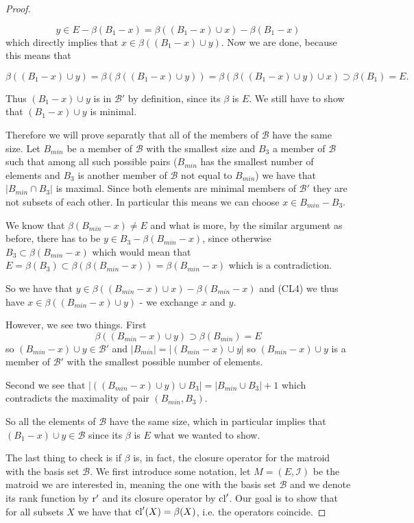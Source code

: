 \begin{proof}
\begin{enumerate}
    $$y \in E - \beta(B_1 - x) = \beta((B_1 -x )\cup x)-\beta(B_1 - x)$$ which directly implies that $x \in \beta((B_1 - x)\cup y)$. Now we are done, because this means that 
    
    $$\beta((B_1-x)\cup y) = \beta(\beta((B_1-x )\cup y)) = \beta(\beta((B_1 - x)\cup y)\cup x) \supset \beta(B_1) = E.$$
    
    
    Thus $(B_1 - x) \cup y$ is in $\mathcal{B}'$ by definition, since its $\beta$ is $E$. We still have to show that $(B_1 - x)\cup y$ is minimal.
    
    Therefore we will prove separatly that all of the members of $\mathcal{B}$ have the same size. Let $B_{min}$ be a member of $\mathcal{B}$ with the smallest size and $B_3$ a member of $\mathcal{B}$ such that among all such possible pairs ($B_{min}$ has the smallest number of elements and $B_3$ is another member of $\mathcal{B}$ not equal to $B_{min}$) we have that $|B_{min} \cap B_3|$ is maximal. Since both elements are minimal members of $\mathcal{B}'$ they are not subsets of each other. In particular this means we can choose $x \in B_{min} - B_3$. 
    
    We know that $\beta(B_{min}-x) \neq E$ and what is more, by the similar argument as before, there has to be $y \in B_3 - \beta(B_{min} - x)$, since otherwise $B_3 \subset \beta(B_{min} - x)$ which would mean that $E = \beta(B_3)\subset \beta(\beta(B_{min}-x)) = \beta(B_{min} - x)$ which is a contradiction. 
    
    So we have that $y \in \beta((B_{min}-x)\cup x) - \beta(B_{min} -x)$ and (CL4) we thus have $x \in \beta((B_{min}-x)\cup y)$ - we exchange $x$ and $y$. 
    
    However, we see two things. First
    $$\beta((B_{min} - x) \cup y) \supset \beta(B_{min}) = E$$ so $(B_{min} - x) \cup y \in \mathcal{B}'$ and $|B_{min}|  = |(B_{min} - x)\cup y|$ so $(B_{min} - x)\cup y$ is a member of $\mathcal{B}'$ with the smallest possible number of elements. 
    
    Second we see that $|((B_{min}-x)\cup y) \cup B_3| = |B_{min}\cup B_3|+1$ which contradicts the maximality of pair $(B_{min} ,B_3)$. 
    
    So all the elements of $\mathcal{B}$ have the same size, which in  particular implies that $(B_1 - x) \cup y \in \mathcal{B}$ since its $\beta$  is $E$ what we wanted to show.
    

\end{enumerate}


The last thing to check is if $\beta$ is, in fact, the closure operator for the matroid with the basis set $\mathcal{B}.$ We first introduce some notation, let $M = (E, \mathcal{I})$ be the matroid we are interested in, meaning the one with the basis set $\mathcal{B}$ and we denote its rank function by $\text{r}'$ and its closure operator by $\mathrm{cl}'$. Our goal is to show that for all subsets $X$ we have that $\mathrm{cl}'(X) = \beta(X)$, i.e. the operators coincide.


\end{proof}
